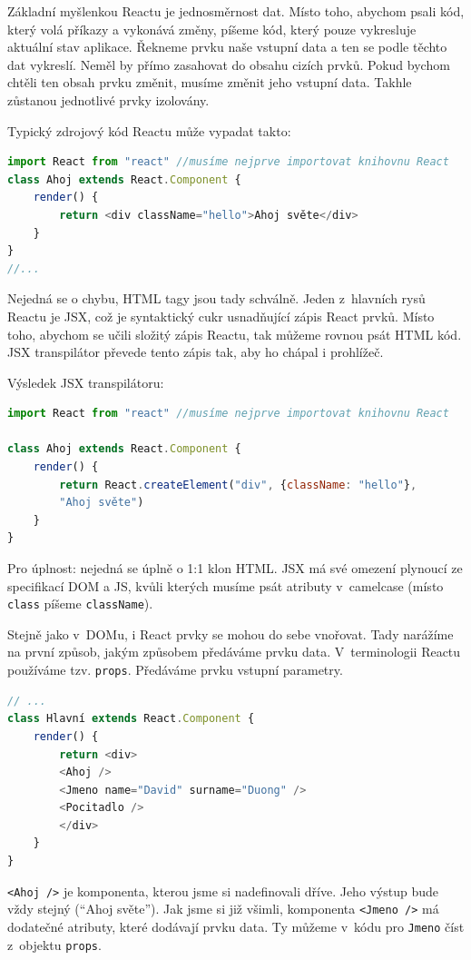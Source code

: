 \documentclass[a4paper,11pt,oneside]{article}
\begin{document}
Základní myšlenkou Reactu je jednosměrnost dat. Místo toho, abychom psali kód, který volá příkazy a vykonává změny, píšeme kód, který pouze vykresluje aktuální stav aplikace. Řekneme prvku naše vstupní data a ten se podle těchto dat vykreslí. Neměl by přímo zasahovat do obsahu cizích prvků. Pokud bychom chtěli ten obsah prvku změnit, musíme změnit jeho vstupní data. Takhle zůstanou jednotlivé prvky izolovány.

Typický zdrojový kód Reactu může vypadat takto:
\begin{lstlisting}[language=javascript, caption={JavaScript}]
import React from "react" //musíme nejprve importovat knihovnu React
class Ahoj extends React.Component {
	render() {
		return <div className="hello">Ahoj světe</div>
	}
}
//...
\end{lstlisting}

Nejedná se o chybu, HTML tagy jsou tady schválně. Jeden z~hlavních rysů Reactu je JSX, což je syntaktický cukr usnadňující zápis React prvků. Místo toho, abychom se učili složitý zápis Reactu, tak můžeme rovnou psát HTML kód. JSX transpilátor převede tento zápis tak, aby ho chápal i prohlížeč. 

Výsledek JSX transpilátoru:

\begin{lstlisting}[language=javascript, caption={JavaScript}]
import React from "react" //musíme nejprve importovat knihovnu React

class Ahoj extends React.Component {
	render() {
		return React.createElement("div", {className: "hello"}, 
		"Ahoj světe")
	}
}
\end{lstlisting}

Pro úplnost: nejedná se úplně o 1:1 klon HTML. JSX má své omezení plynoucí ze specifikací DOM a JS, kvůli kterých musíme psát atributy v~camelcase (místo \lstinline|class| píšeme \lstinline|className|).

Stejně jako v~DOMu, i React prvky se mohou do sebe vnořovat. Tady narážíme na první způsob, jakým způsobem předáváme prvku data. V~terminologii Reactu používáme tzv. \lstinline|props|. Předáváme prvku vstupní parametry.

\begin{lstlisting}[language=javascript, caption={JavaScript}]
// ...
class Hlavní extends React.Component {
	render() {
		return <div>
		<Ahoj />
		<Jmeno name="David" surname="Duong" />
		<Pocitadlo />
		</div>
	}
}
\end{lstlisting}

\lstinline|<Ahoj />| je komponenta, kterou jsme si nadefinovali dříve. Jeho výstup bude vždy stejný (\enquote{Ahoj světe}). Jak jsme si již všimli, komponenta \lstinline|<Jmeno />| má dodatečné atributy, které dodávají prvku data. Ty můžeme v~kódu pro \lstinline|Jmeno| číst z~objektu \lstinline|props|. 
\end{document}
